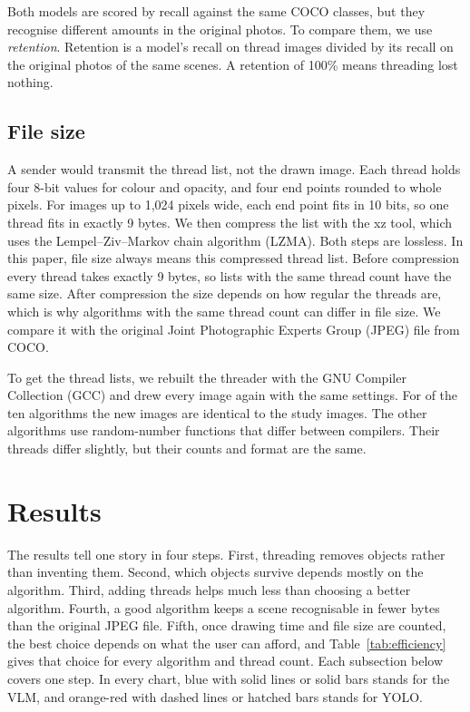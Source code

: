 \documentclass[conference]{IEEEtran}
\begin{document}
Both models are scored by recall against the same COCO classes, but they recognise different amounts in the original photos. To compare them, we use \emph{retention}. Retention is a model's recall on thread images divided by its recall on the original photos of the same scenes. A retention of 100\% means threading lost nothing.

\subsection{File size}

A sender would transmit the thread list, not the drawn image. Each thread holds four 8-bit values for colour and opacity, and four end points rounded to whole pixels. For images up to 1,024 pixels wide, each end point fits in 10 bits, so one thread fits in exactly 9 bytes. We then compress the list with the xz tool, which uses the Lempel--Ziv--Markov chain algorithm (LZMA). Both steps are lossless. In this paper, file size always means this compressed thread list. Before compression every thread takes exactly 9 bytes, so lists with the same thread count have the same size. After compression the size depends on how regular the threads are, which is why algorithms with the same thread count can differ in file size. We compare it with the original Joint Photographic Experts Group (JPEG) file from COCO.

To get the thread lists, we rebuilt the threader with the GNU Compiler Collection (GCC) and drew every image again with the same settings. For \IdenticalMethods{} of the ten algorithms the new images are identical to the study images. The other algorithms use random-number functions that differ between compilers. Their threads differ slightly, but their counts and format are the same.

\section{Results}
\label{sec:results}

The results tell one story in four steps. First, threading removes objects rather than inventing them. Second, which objects survive depends mostly on the algorithm. Third, adding threads helps much less than choosing a better algorithm. Fourth, a good algorithm keeps a scene recognisable in fewer bytes than the original JPEG file. Fifth, once drawing time and file size are counted, the best choice depends on what the user can afford, and Table~\ref{tab:efficiency} gives that choice for every algorithm and thread count. Each subsection below covers one step. In every chart, blue with solid lines or solid bars stands for the VLM, and orange-red with dashed lines or hatched bars stands for YOLO.
\end{document}

